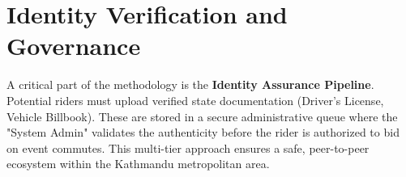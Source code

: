 \section{Identity Verification and Governance}
A critical part of the methodology is the \textbf{Identity Assurance Pipeline}. Potential riders must upload verified state documentation (Driver's License, Vehicle Billbook). These are stored in a secure administrative queue where the "System Admin" validates the authenticity before the rider is authorized to bid on event commutes. This multi-tier approach ensures a safe, peer-to-peer ecosystem within the Kathmandu metropolitan area.